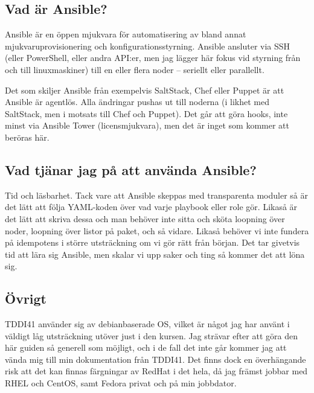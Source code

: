 \subsection{Vad är Ansible?}
Ansible är en öppen mjukvara för automatisering av bland annat mjukvaruprovisionering och konfigurationsstyrning. Ansible ansluter via SSH (eller PowerShell, eller andra API:er, men jag lägger här fokus vid styrning från och till linuxmaskiner) till en eller flera noder -- seriellt eller parallellt.

Det som skiljer Ansible från exempelvis SaltStack, Chef eller Puppet är att Ansible är agentlös. Alla ändringar pushas ut till noderna (i likhet med SaltStack, men i motsats till Chef och Puppet). Det går att göra hooks, inte minst via Ansible Tower (licensmjukvara), men det är inget som kommer att beröras här.

\subsection{Vad tjänar jag på att använda Ansible?}
Tid och läsbarhet. Tack vare att Ansible skeppas med transparenta moduler så är det lätt att följa YAML-koden över vad varje playbook eller role gör. 
Likaså är det lätt att skriva dessa och man behöver inte sitta och sköta loopning över noder, loopning över listor på paket, och så vidare. Likaså behöver vi inte fundera på idempotens i större utsträckning om vi gör rätt från början.
Det tar givetvis tid att lära sig Ansible, men skalar vi upp saker och ting så kommer det att löna sig.

\subsection{Övrigt}
TDDI41 använder sig av debianbaserade OS, vilket är något jag har använt i väldigt låg utsträckning utöver just i den kursen. Jag strävar efter att göra den här guiden så generell som möjligt, och i de fall det inte går
kommer jag att vända mig till min dokumentation från TDDI41. Det finns dock en överhängande risk att det kan finnas färgningar av RedHat i det hela, då jag främst jobbar med RHEL och CentOS, samt Fedora privat och på min jobbdator.
